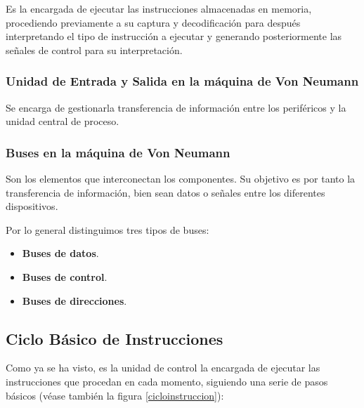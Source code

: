 \documentclass[a4paper, 11pt, titlepage]{article}
\begin{document}
            Es la encargada de ejecutar las instrucciones almacenadas en memoria, procediendo previamente 
            a su captura y decodificación para después interpretando el tipo de instrucción a ejecutar y 
            generando posteriormente las señales de control para su interpretación.
            
        \subsubsection{Unidad de Entrada y Salida en la máquina de Von Neumann}

            Se encarga de gestionarla transferencia de información entre los periféricos y la unidad 
            central de proceso.

        \subsubsection{Buses en la máquina de Von Neumann}

            Son los elementos que interconectan los componentes. Su objetivo es por tanto la transferencia 
            de información, bien sean datos o señales entre los diferentes dispositivos.

            Por lo general distinguimos tres tipos de buses:

            \begin{itemize}
                \item \textbf{Buses de datos}.
                \item \textbf{Buses de control}.
                \item \textbf{Buses de direcciones}.
            \end{itemize}

    \subsection{Ciclo Básico de Instrucciones}

        Como ya se ha visto, es la unidad de control la encargada de ejecutar las instrucciones que procedan 
        en cada momento, siguiendo una serie de pasos básicos (véase también la figura \ref{cicloinstruccion}):
\end{document}
